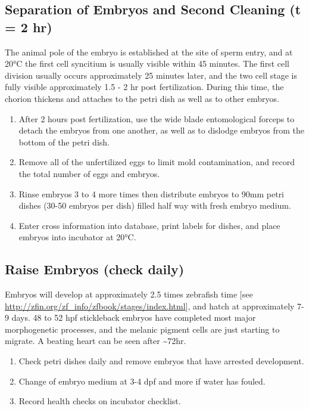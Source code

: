 \documentclass[
  letterpaper,
  DIV=11,
  numbers=noendperiod]{scrreprt}
\providecommand{\tightlist}{%
  \setlength{\itemsep}{0pt}\setlength{\parskip}{0pt}}\usepackage{longtable,booktabs,array}
\begin{document}
\hypertarget{separation-of-embryos-and-second-cleaning-t-2-hr}{%
\subsection{Separation of Embryos and Second Cleaning (t = 2
hr)}\label{separation-of-embryos-and-second-cleaning-t-2-hr}}

The animal pole of the embryo is established at the site of sperm entry,
and at 20°C the first cell syncitium is usually visible within 45
minutes. The first cell division usually occurs approximately 25 minutes
later, and the two cell stage is fully visible approximately 1.5 - 2 hr
post fertilization. During this time, the chorion thickens and attaches
to the petri dish as well as to other embryos.

\begin{enumerate}
\def\labelenumi{\arabic{enumi}.}
\setcounter{enumi}{21}
\tightlist
\item
  After 2 hours post fertilization, use the wide blade entomological
  forceps to detach the embryos from one another, as well as to dislodge
  embryos from the bottom of the petri dish.
\item
  Remove all of the unfertilized eggs to limit mold contamination, and
  record the total number of eggs and embryos.
\item
  Rinse embryos 3 to 4 more times then distribute embryos to 90mm petri
  dishes (30-50 embryos per dish) filled half way with fresh embryo
  medium.
\item
  Enter cross information into database, print labels for dishes, and
  place embryos into incubator at 20°C.
\end{enumerate}

\hypertarget{raise-embryos-check-daily}{%
\subsection{Raise Embryos (check
daily)}\label{raise-embryos-check-daily}}

Embryos will develop at approximately 2.5 times zebrafish time {[}see
\url{http://zfin.org/zf_info/zfbook/stages/index.html}{]}, and hatch at
approximately 7-9 days. 48 to 52 hpf stickleback embryos have completed
most major morphogenetic processes, and the melanic pigment cells are
just starting to migrate. A beating heart can be seen after
\textasciitilde72hr.

\begin{enumerate}
\def\labelenumi{\arabic{enumi}.}
\setcounter{enumi}{25}
\tightlist
\item
  Check petri dishes daily and remove embryos that have arrested
  development.
\item
  Change of embryo medium at 3-4 dpf and more if water has fouled.
\item
  Record health checks on incubator checklist.
\end{enumerate}
\end{document}
